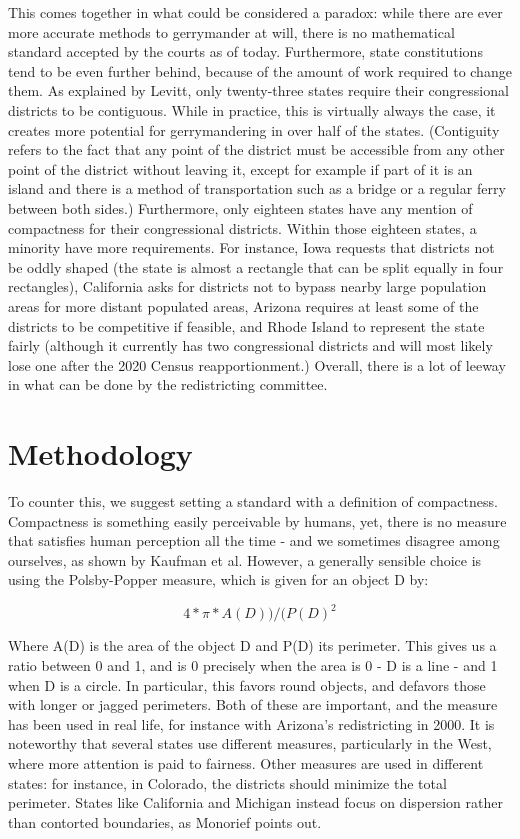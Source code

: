 \documentclass[letterpaper]{article}
\begin{document}
This comes together in what could be considered a paradox: while there are ever more accurate methods to gerrymander at will, there is no mathematical standard accepted by the courts as of today. Furthermore, state constitutions tend to be even further behind, because of the amount of work required to change them. As explained by Levitt, only twenty-three states require their congressional districts to be contiguous. While in practice, this is virtually always the case, it creates more potential for gerrymandering in over half of the states. (Contiguity refers to the fact that any point of the district must be accessible from any other point of the district without leaving it, except for example if part of it is an island and there is a method of transportation such as a bridge or a regular ferry between both sides.) Furthermore, only eighteen states have any mention of compactness for their congressional districts. Within those eighteen states, a minority have more requirements. For instance, Iowa requests that districts not be oddly shaped (the state is almost a rectangle that can be split equally in four rectangles), California asks for districts not to bypass nearby large population areas for more distant populated areas, Arizona requires at least some of the districts to be competitive if feasible, and Rhode Island to represent the state fairly (although it currently has two congressional districts and will most likely lose one after the 2020 Census reapportionment.) Overall, there is a lot of leeway in what can be done by the redistricting committee. 


\section{Methodology}
To counter this, we suggest setting a standard with a definition of compactness. Compactness is something easily perceivable by humans, yet, there is no measure that satisfies human perception all the time - and we sometimes disagree among ourselves, as shown by Kaufman et al. 
However, a generally sensible choice is using the Polsby-Popper measure, which is given for an object D by:

\[
	4*\pi*A(D) ) / ( P(D)^2
\]

Where A(D) is the area of the object D and P(D) its perimeter. This gives us a ratio between 0 and 1, and is 0 precisely when the area is 0 - D is a line - and 1 when D is a circle. In particular, this favors round objects, and defavors those with longer or jagged perimeters. Both of these are important, and the measure has been used in real life, for instance with Arizona’s redistricting in 2000. It is noteworthy that several states use different measures, particularly in the West, where more attention is paid to fairness. Other measures are used in different states: for instance, in Colorado, the districts should minimize the total perimeter. States like California and Michigan instead focus on dispersion rather than contorted boundaries, as Monorief points out. 
\end{document}
